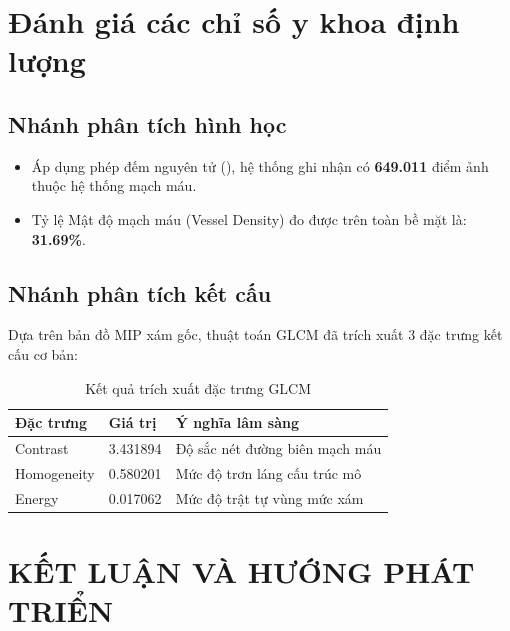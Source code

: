 

\section{Đánh giá các chỉ số y khoa định lượng }

\subsection{Nhánh phân tích hình học }

\begin{itemize}
    \item Áp dụng phép đếm nguyên tử (), hệ thống ghi nhận có \textbf{649.011} điểm ảnh thuộc hệ thống mạch máu.
    \item Tỷ lệ Mật độ mạch máu (Vessel Density) đo được trên toàn bề mặt là: \textbf{31.69\%}.
\end{itemize}

\subsection{Nhánh phân tích kết cấu}

Dựa trên bản đồ MIP xám gốc, thuật toán GLCM đã trích xuất 3 đặc trưng kết cấu cơ bản:

\begin{table}[h!]
\caption{Kết quả trích xuất đặc trưng GLCM}
\label{tab:glcm_results}
\centering
\begin{tabular}{l l l}
    \toprule
    \textbf{Đặc trưng} & \textbf{Giá trị} & \textbf{Ý nghĩa lâm sàng} \\
    \midrule
    Contrast & 3.431894 & Độ sắc nét đường biên mạch máu \\
    Homogeneity & 0.580201 & Mức độ trơn láng cấu trúc mô \\
    Energy & 0.017062 & Mức độ trật tự vùng mức xám \\
    \bottomrule
\end{tabular}
\end{table}


\newpage
\section*{KẾT LUẬN VÀ HƯỚNG PHÁT TRIỂN}

